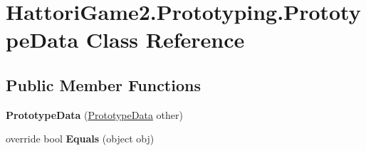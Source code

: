 \hypertarget{class_hattori_game2_1_1_prototyping_1_1_prototype_data}{}\section{Hattori\+Game2.\+Prototyping.\+Prototype\+Data Class Reference}
\label{class_hattori_game2_1_1_prototyping_1_1_prototype_data}
\subsection*{Public Member Functions}
\begin{DoxyCompactItemize}
\item 
\hypertarget{class_hattori_game2_1_1_prototyping_1_1_prototype_data_a954b4762817fc44648e637c4c7911373}{}{\bfseries Prototype\+Data} (\hyperlink{class_hattori_game2_1_1_prototyping_1_1_prototype_data}{Prototype\+Data} other)\label{class_hattori_game2_1_1_prototyping_1_1_prototype_data_a954b4762817fc44648e637c4c7911373}

\item 
\hypertarget{class_hattori_game2_1_1_prototyping_1_1_prototype_data_a0fc2b11db7ca74c5780d18c23cdc09ab}{}override bool {\bfseries Equals} (object obj)\label{class_hattori_game2_1_1_prototyping_1_1_prototype_data_a0fc2b11db7ca74c5780d18c23cdc09ab}

\end{DoxyCompactItemize}
